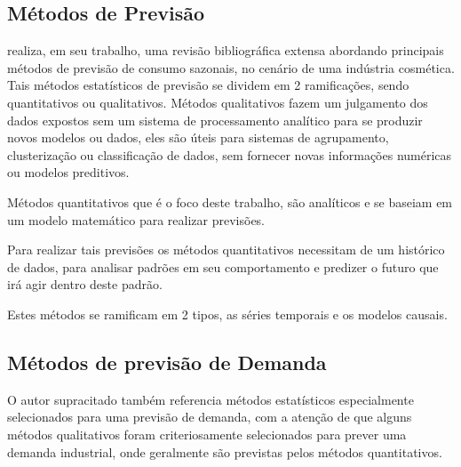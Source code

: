 \documentclass[	12pt, Times, openright, twoside, a4paper, english, brazil]{abntex2}
\begin{document}
        \subsection{Métodos de Previsão} 

          \cite{Junior2007} realiza, em seu trabalho, uma revisão bibliográfica extensa abordando principais métodos de previsão de consumo sazonais, no cenário de uma indústria cosmética. Tais métodos estatísticos de previsão se dividem em 2 ramificações, sendo quantitativos ou qualitativos. Métodos qualitativos fazem um julgamento dos dados expostos sem um sistema de processamento analítico para se produzir novos modelos ou dados, eles são úteis para sistemas de agrupamento, clusterização ou classificação de dados, sem fornecer novas informações numéricas ou modelos preditivos.

          Métodos quantitativos que é o foco deste trabalho, são analíticos e se baseiam em um modelo matemático para realizar previsões. 

          Para realizar tais previsões os métodos quantitativos necessitam de um histórico de dados, para analisar padrões em seu comportamento e predizer o futuro que irá agir dentro deste padrão.

          Estes métodos se ramificam em 2 tipos, as séries temporais e os modelos causais.
          \begin{figure}[H]
          \end{figure}

        \subsection{Métodos de previsão de Demanda}
          O autor supracitado também referencia métodos estatísticos especialmente selecionados para uma previsão de demanda, com a atenção de que alguns métodos qualitativos foram criteriosamente selecionados para prever uma demanda industrial, onde geralmente são previstas pelos métodos quantitativos.
\end{document}
